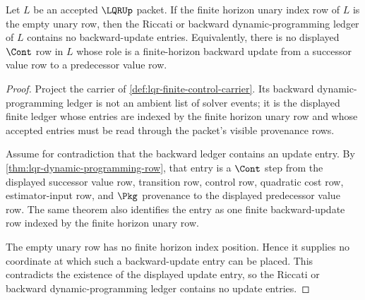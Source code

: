 \begin{theorem}
\label{thm:lqr-empty-horizon-backward-ledger}
Let $L$ be an accepted $\LQRUp$ packet. If the finite horizon unary index row of $L$ is the empty unary row, then the Riccati or backward dynamic-programming ledger of $L$ contains no backward-update entries. Equivalently, there is no displayed $\Cont$ row in $L$ whose role is a finite-horizon backward update from a successor value row to a predecessor value row.
\end{theorem}
\begin{proof}
Project the carrier of \autoref{def:lqr-finite-control-carrier}. Its backward dynamic-programming ledger is not an ambient list of solver events; it is the displayed finite ledger whose entries are indexed by the finite horizon unary row and whose accepted entries must be read through the packet's visible provenance rows.

Assume for contradiction that the backward ledger contains an update entry. By \autoref{thm:lqr-dynamic-programming-row}, that entry is a $\Cont$ step from the displayed successor value row, transition row, control row, quadratic cost row, estimator-input row, and $\Pkg$ provenance to the displayed predecessor value row. The same theorem also identifies the entry as one finite backward-update row indexed by the finite horizon unary row.

The empty unary row has no finite horizon index position. Hence it supplies no coordinate at which such a backward-update entry can be placed. This contradicts the existence of the displayed update entry, so the Riccati or backward dynamic-programming ledger contains no update entries.
\end{proof}

